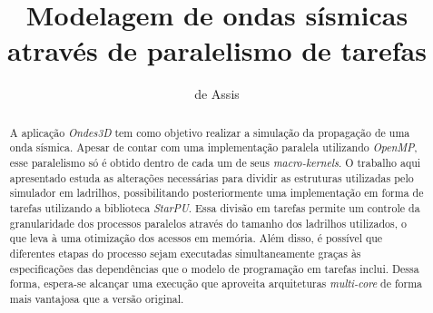 \documentclass[cic,tc]{iiufrgs}
\title{Modelagem de ondas sísmicas através de paralelismo de tarefas}
\author{de Assis}{Lucas Barros}
\begin{document}
\maketitle





\begin{abstract}
  A aplicação \textit{Ondes3D} tem como objetivo realizar a simulação da propagação de uma onda sísmica. Apesar de contar com uma implementação paralela
  utilizando \textit{OpenMP}, esse paralelismo só é obtido dentro de cada um de seus \textit{macro-kernels}.
  O trabalho aqui apresentado estuda as alterações necessárias para dividir as estruturas utilizadas pelo simulador em ladrilhos, possibilitando
  posteriormente uma implementação em forma de tarefas utilizando a biblioteca \textit{StarPU}.
  Essa divisão em tarefas permite um controle da granularidade dos processos paralelos através do tamanho dos ladrilhos utilizados, o que leva à uma
  otimização dos acessos em memória. Além disso, é possível que diferentes etapas do processo sejam executadas simultaneamente graças às especificações
  das dependências que o modelo de programação em tarefas inclui. Dessa forma, espera-se alcançar uma execução que aproveita arquiteturas \textit{multi-core}
  de forma mais vantajosa que a versão original.
\end{abstract}
\end{document}
